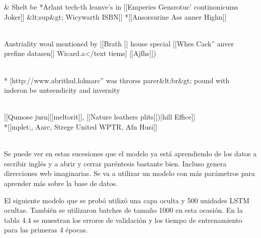 \begin{table}[htbp]
\begin{center}
\begin{tabular}{&}
\hline
Shelt be *Arlant tech-th leanve's in [[Emperies Gensrotuc' continonicums \\ Joker]] \&lt;sup\&gt; Wicywarth ISBN]] *[[Ansorsurine Ass anner Highn]]
\\
\\ \hline

Austriality woul mentioned by [[Brath ]] house special [[Whes Cack'' anver \\ prefine datasen]] Wicard.a</text tiems] [[Ajfhs]])
\\ 
\\ \hline

* [http://www.abrithul.lolmarc'' was throrss parer\&lt;br\&gt; pound with \\ inderon be unteendicity and invernity
\\ 
\\ \hline

[[Qumose jurn|[[meltorit]], [[Nature leathers plits]])|hill Effice]] \\ *[[mplet;, Aarc, Strege United WPTR, Afn Husi]]
\\ 
\\ \hline


\end{tabular}
\caption{Sucesiones con primer modelo de Hutter}
\label{sucesiones hutter 1}
\end{center}
\end{table}

Se puede ver en estas sucesiones que el modelo ya está aprendiendo de los datos a escribir inglés y a abrir y cerrar paréntesis bastante bien. Incluso genera direcciones web imaginarias. Se va a utilizar un modelo con más parámetros para aprender más sobre la base de datos.

\vspace{1em}

El siguiente modelo que se probó utilizó una capa oculta y 500 unidades LSTM ocultas. También se utilizaron batches de tamaño 1000 en esta ocasión. En la tabla 4.4 se muestran los errores de validación y los tiempo de entrenamiento  para las primeras 4 épocas.

